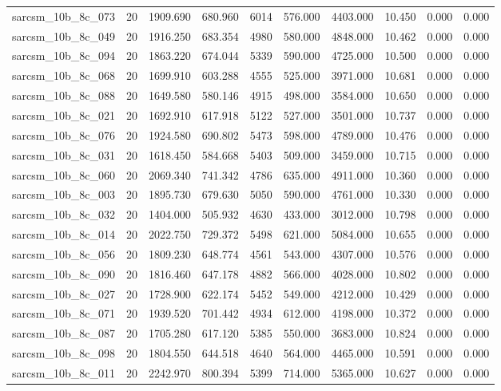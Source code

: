 \begin{tabular}{lrrrrrrrrr}
sarcsm\_10b\_8c\_073 & 20 & 1909.690 & 680.960 & 6014 & 576.000 & 4403.000 & 10.450 & 0.000 & 0.000 \\
sarcsm\_10b\_8c\_049 & 20 & 1916.250 & 683.354 & 4980 & 580.000 & 4848.000 & 10.462 & 0.000 & 0.000 \\
sarcsm\_10b\_8c\_094 & 20 & 1863.220 & 674.044 & 5339 & 590.000 & 4725.000 & 10.500 & 0.000 & 0.000 \\
sarcsm\_10b\_8c\_068 & 20 & 1699.910 & 603.288 & 4555 & 525.000 & 3971.000 & 10.681 & 0.000 & 0.000 \\
sarcsm\_10b\_8c\_088 & 20 & 1649.580 & 580.146 & 4915 & 498.000 & 3584.000 & 10.650 & 0.000 & 0.000 \\
sarcsm\_10b\_8c\_021 & 20 & 1692.910 & 617.918 & 5122 & 527.000 & 3501.000 & 10.737 & 0.000 & 0.000 \\
sarcsm\_10b\_8c\_076 & 20 & 1924.580 & 690.802 & 5473 & 598.000 & 4789.000 & 10.476 & 0.000 & 0.000 \\
sarcsm\_10b\_8c\_031 & 20 & 1618.450 & 584.668 & 5403 & 509.000 & 3459.000 & 10.715 & 0.000 & 0.000 \\
sarcsm\_10b\_8c\_060 & 20 & 2069.340 & 741.342 & 4786 & 635.000 & 4911.000 & 10.360 & 0.000 & 0.000 \\
sarcsm\_10b\_8c\_003 & 20 & 1895.730 & 679.630 & 5050 & 590.000 & 4761.000 & 10.330 & 0.000 & 0.000 \\
sarcsm\_10b\_8c\_032 & 20 & 1404.000 & 505.932 & 4630 & 433.000 & 3012.000 & 10.798 & 0.000 & 0.000 \\
sarcsm\_10b\_8c\_014 & 20 & 2022.750 & 729.372 & 5498 & 621.000 & 5084.000 & 10.655 & 0.000 & 0.000 \\
sarcsm\_10b\_8c\_056 & 20 & 1809.230 & 648.774 & 4561 & 543.000 & 4307.000 & 10.576 & 0.000 & 0.000 \\
sarcsm\_10b\_8c\_090 & 20 & 1816.460 & 647.178 & 4882 & 566.000 & 4028.000 & 10.802 & 0.000 & 0.000 \\
sarcsm\_10b\_8c\_027 & 20 & 1728.900 & 622.174 & 5452 & 549.000 & 4212.000 & 10.429 & 0.000 & 0.000 \\
sarcsm\_10b\_8c\_071 & 20 & 1939.520 & 701.442 & 4934 & 612.000 & 4198.000 & 10.372 & 0.000 & 0.000 \\
sarcsm\_10b\_8c\_087 & 20 & 1705.280 & 617.120 & 5385 & 550.000 & 3683.000 & 10.824 & 0.000 & 0.000 \\
sarcsm\_10b\_8c\_098 & 20 & 1804.550 & 644.518 & 4640 & 564.000 & 4465.000 & 10.591 & 0.000 & 0.000 \\
sarcsm\_10b\_8c\_011 & 20 & 2242.970 & 800.394 & 5399 & 714.000 & 5365.000 & 10.627 & 0.000 & 0.000 \\

\end{tabular}
